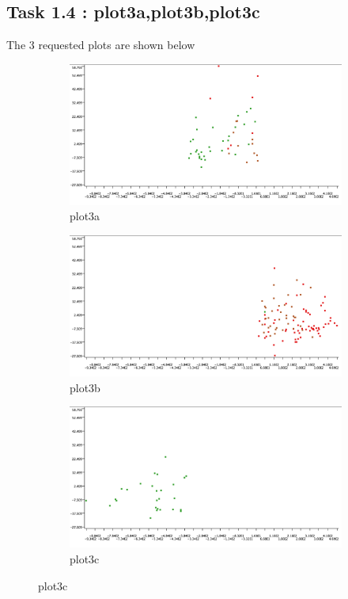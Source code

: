 \documentclass[12pt]{article}
\begin{document}
	 \subsection*{Task 1.4 : plot3a,plot3b,plot3c}
		The 3 requested plots are shown below
		 \begin{figure}[H]
		 	\centering
		 	\begin{subfigure}{0.4\textwidth}
		 		\includegraphics[width=\textwidth]{res/plot3a}
		 		\caption{plot3a}
		 		\label{fig:first}
		 	\end{subfigure}
		 	\hfill
		 	\begin{subfigure}{0.4\textwidth}
		 		\includegraphics[width=\textwidth]{res/plot3b}
		 		\caption{plot3b}
		 		\label{fig:second}
		 	\end{subfigure}
		 	\hfill
		 	\begin{subfigure}{0.4\textwidth}
		 		\includegraphics[width=\textwidth]{res/plot3c}
		 		\caption{plot3c}
		 		\label{fig:third}
		 	\end{subfigure}
		 	
		 	\label{fig:figures}
		 \end{figure}
\end{document}
